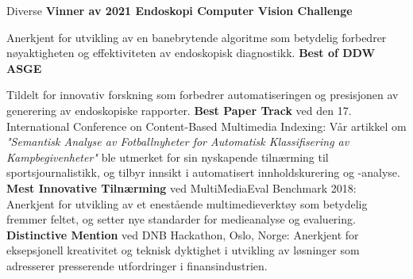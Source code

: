 \begin{rubric}{Diverse}
\entry*[] \textbf{Vinner av 2021 Endoskopi Computer Vision Challenge} \par
Anerkjent for utvikling av en banebrytende algoritme som betydelig forbedrer nøyaktigheten og effektiviteten av endoskopisk diagnostikk.
%
\entry*[] \textbf{Best of DDW ASGE} \par
Tildelt for innovativ forskning som forbedrer automatiseringen og presisjonen av generering av endoskopiske rapporter.
%
\entry*[] \textbf{Best Paper Track} ved den 17. International Conference on Content-Based Multimedia Indexing: Vår artikkel om \textit{"Semantisk Analyse av Fotballnyheter for Automatisk Klassifisering av Kampbegivenheter"} ble utmerket for sin nyskapende tilnærming til sportsjournalistikk, og tilbyr innsikt i automatisert innholdskurering og -analyse.
%
\entry*[] \textbf{Mest Innovative Tilnærming} ved MultiMediaEval Benchmark 2018: Anerkjent for utvikling av et enestående multimedieverktøy som betydelig fremmer feltet, og setter nye standarder for medieanalyse og evaluering.
%
\entry*[] \textbf{Distinctive Mention} ved DNB Hackathon, Oslo, Norge: Anerkjent for eksepsjonell kreativitet og teknisk dyktighet i utvikling av løsninger som adresserer presserende utfordringer i finansindustrien.
\end{rubric}
